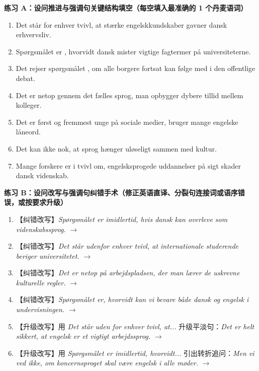 \textbf{练习 A：设问推进与强调句关键结构填空（每空填入最准确的 1 个丹麦语词）}
\begin{enumerate}
  \item Det står \underline{\hspace{2.2cm}} for enhver tvivl, at stærke engelskkundskaber gavner dansk erhvervsliv.
  \item Spørgsmålet er \underline{\hspace{2.2cm}}, hvorvidt dansk mister vigtige fagtermer på universiteterne.
  \item Det rejser spørgsmålet \underline{\hspace{2.2cm}}, om alle borgere fortsat kan følge med i den offentlige debat.
  \item Det er netop gennem det fælles sprog, \underline{\hspace{2.2cm}} man opbygger dybere tillid mellem kolleger.
  \item Det er først og fremmest unge på sociale medier, \underline{\hspace{2.2cm}} bruger mange engelske låneord.
  \item Det kan ikke \underline{\hspace{2.2cm}} nok, at sprog hænger uløseligt sammen med kultur.
  \item Mange forskere er i tvivl om, \underline{\hspace{2.2cm}} engelsksprogede uddannelser på sigt skader dansk videnskab.
\end{enumerate}

\textbf{练习 B：设问改写与强调句纠错手术（修正英语直译、分裂句连接词或语序错误，或按要求升级）}
\begin{enumerate}
  \item 【纠错改写】\textit{Spørgsmålet er imidlertid, hvis dansk kan overleve som videnskabssprog.} $\rightarrow$
  \item 【纠错改写】\textit{Det står udenfor enhver tvivl, at internationale studerende beriger universitetet.} $\rightarrow$
  \item 【纠错改写】\textit{Det er netop på arbejdspladsen, der man lærer de uskrevne kulturelle regler.} $\rightarrow$
  \item 【纠错改写】\textit{Spørgsmålet er, hvorvidt kan vi bevare både dansk og engelsk i undervisningen.} $\rightarrow$
  \item 【升级改写】用 \textit{Det står uden for enhver tvivl, at...} 升级平淡句：\textit{Det er helt sikkert, at engelsk er et vigtigt arbejdssprog.} $\rightarrow$
  \item 【升级改写】用 \textit{Spørgsmålet er imidlertid, hvorvidt...} 引出转折追问：\textit{Men vi ved ikke, om koncernsproget skal være engelsk i alle møder.} $\rightarrow$
\end{enumerate}


